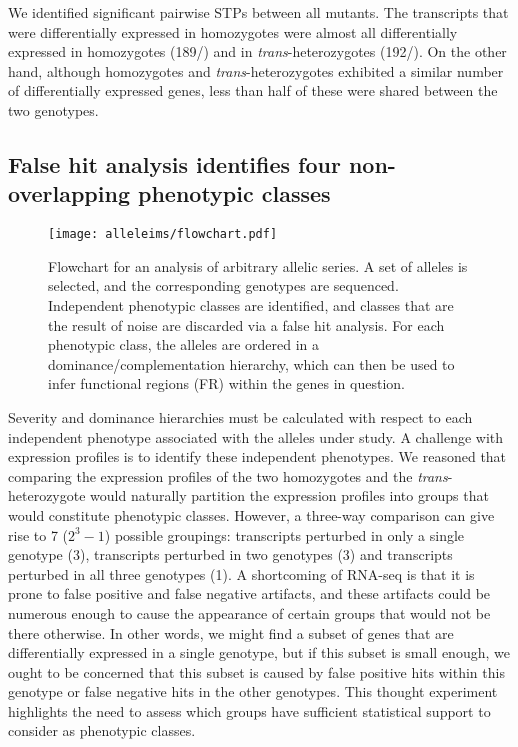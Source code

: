 We identified significant pairwise STPs between all \dpy{} mutants. The
transcripts that were differentially expressed in \bx{} homozygotes were almost
all differentially expressed in \sy{} homozygotes (189/\weakn{}) and in
\emph{trans}-heterozygotes (192/\weakn{}). On the other hand, although \sy{}
homozygotes and \emph{trans}-heterozygotes exhibited a similar number of
differentially expressed genes, less than half of these were shared between the
two genotypes.

\subsection*{False hit analysis identifies four non-overlapping phenotypic
             classes}

\begin{figure*}
 \centering{}
 \texttt{[image: alleleims/flowchart.pdf]}
 \caption{
         Flowchart for an analysis of arbitrary allelic series. A set of alleles
         is selected, and the corresponding genotypes are sequenced. Independent
         phenotypic classes are identified, and classes that are the result of
         noise are discarded via a false hit analysis. For each phenotypic
         class, the alleles are ordered in a dominance/complementation
         hierarchy, which can then be used to infer functional regions (FR)
         within the genes in question.
         }
\label{fig:flowchart}
\end{figure*}

Severity and dominance hierarchies must be calculated with respect to each
independent phenotype associated with the alleles under study. A challenge with
expression profiles is to identify these independent phenotypes. We reasoned
that comparing the expression profiles of the two \dpy{} homozygotes and the
\emph{trans}-heterozygote would naturally partition the expression profiles into
groups that would constitute phenotypic classes. However, a three-way comparison
can give rise to 7 ($2^3-1$) possible groupings: transcripts perturbed in only a
single genotype (3), transcripts perturbed in two genotypes (3) and transcripts
perturbed in all three genotypes (1). A shortcoming of RNA-seq is that it is
prone to false positive and false negative artifacts, and these artifacts could
be numerous enough to cause the appearance of certain groups that would not
be there otherwise. In other words, we might find a subset of genes that are
differentially expressed in a single genotype, but if this subset is small
enough, we ought to be concerned that this subset is caused by false positive
hits within this genotype or false negative hits in the other genotypes. This
thought experiment highlights the need to assess which groups have sufficient
statistical support to consider as phenotypic classes.

